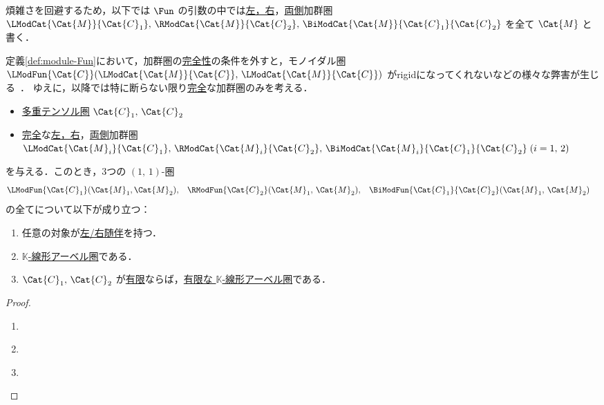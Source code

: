 \documentclass[TQFT_main]{subfiles}
\begin{document}
\begin{marker}
    煩雑さを回避するため，以下では $\Fun$ の引数の中では\hyperref[def:modulecat]{左，右}，\hyperref[def:bimodulecat]{両側}加群圏 $\LModCat{\Cat{M}}{\Cat{C}_1},\, \RModCat{\Cat{M}}{\Cat{C}_2},\, \BiModCat{\Cat{M}}{\Cat{C}_1}{\Cat{C}_2}$ を全て $\Cat{M}$ と書く．
\end{marker}

\begin{marker}
    定義\ref{def:module-Fun}において，加群圏の\hyperref[def:modulecat-exact]{完全性}の条件を外すと，モノイダル圏 $\LModFun{\Cat{C}} (\LModCat{\Cat{M}}{\Cat{C}},\, \LModCat{\Cat{M}}{\Cat{C}})$ がrigidになってくれないなどの様々な弊害が生じる~\cite[p.154]{etingof2015tensor}．
    ゆえに，以降では特に断らない限り\hyperref[def:modulecat-exact]{完全}な加群圏のみを考える．
\end{marker}

\begin{mylem}[label=lem:exact-Fun]{}
    \begin{itemize}
        \item \hyperref[def:tensorfusion-cat]{多重テンソル圏} $\Cat{C}_1,\, \Cat{C}_2$
        \item \hyperref[def:modulecat-exact]{完全}な\hyperref[def:modulecat]{左，右}，\hyperref[def:bimodulecat]{両側}加群圏 $\LModCat{\Cat{M}_i}{\Cat{C}_1},\, \RModCat{\Cat{M}_i}{\Cat{C}_2},\, \BiModCat{\Cat{M}_i}{\Cat{C}_1}{\Cat{C}_2}\; (i=1,\, 2)$
    \end{itemize}
    を与える．このとき，3つの $(1,\, 1)$-圏
    \begin{align}
        &\LModFun{\Cat{C}_1} (\Cat{M}_1, \Cat{M}_2), &&\RModFun{\Cat{C}_2} (\Cat{M}_1,\, \Cat{M}_2), &&\BiModFun{\Cat{C}_1}{\Cat{C}_2} (\Cat{M}_1,\, \Cat{M}_2)
    \end{align}
    の全てについて以下が成り立つ：
    \begin{enumerate}
        \item 任意の対象が\hyperref[def:adjoint]{左/右随伴}を持つ．
        \item \hyperref[def:additive-cat]{$\mathbb{K}$-線形アーベル圏}である．
        \item $\Cat{C}_1,\, \Cat{C}_2$ が\hyperref[def:finite-abcat]{有限}ならば，\hyperref[def:finite-abcat]{有限な $\mathbb{K}$-線形アーベル圏}である．
    \end{enumerate}
\end{mylem}

\begin{proof}
    \begin{enumerate}
        \item ~\cite[LEMMA 7.11.4.]{etingof2015tensor}
        \item ~\cite[PROPOSITION 7.11.1.]{etingof2015tensor}
        \item ~\cite[PROPOSITION 7.11.6.]{etingof2015tensor}
    \end{enumerate}
\end{proof}
\end{document}
